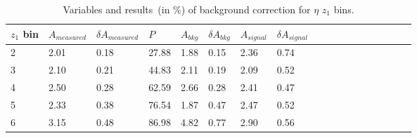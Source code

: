 
\begin{table}[H]\footnotesize
\centering
\begin{tabular}{|l|l|l|l|l|l|l|l|l|l|l|l|l|l|l|l|l|l|}
\\ \hline
$z_1$ bin & $A_{measured}$ & $\delta A_{measured}$ & $P$  & $A_{bkg}$ & $\delta A_{bkg}$ & $A_{signal}$ & $\delta A_{signal}$ \\ \hline
2 & 2.01 & 0.18 & 27.88 & 1.88 & 0.15 & 2.36  & 0.74 \\ \hline 
3 & 2.10 & 0.21 & 44.83 & 2.11 & 0.19 & 2.09 & 0.52 \\ \hline 
4 & 2.50 & 0.28 & 62.59 & 2.66 & 0.28 & 2.41 & 0.47 \\ \hline 
5 & 2.33 & 0.38 & 76.54 & 1.87 & 0.47 & 2.47 & 0.52 \\ \hline 
6 & 3.15 & 0.48 & 86.98 & 4.82 & 0.77 & 2.90  & 0.56 \\ \hline 
\end{tabular}
\caption{Variables and results~(in $\%$) of background correction for $\eta$ $z_1$ bins. }
\label{tab:etasinzbkgcor}
\end{table}

